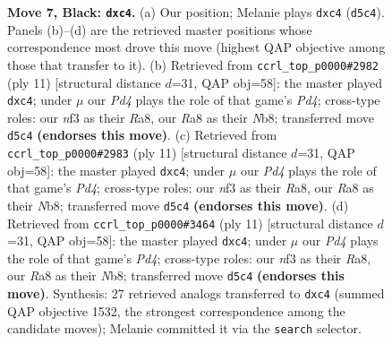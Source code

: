 \documentclass[11pt]{article}
\begin{document}
\begin{figure}[p]
\caption{\textbf{Move 7, Black: \texttt{dxc4}.} (a) Our position; Melanie plays \texttt{dxc4} (\texttt{d5c4}). Panels (b)--(d) are the retrieved master positions whose correspondence most drove this move (highest QAP objective among those that transfer to it). (b) Retrieved from \texttt{ccrl\_top\_p0000\#2982} (ply 11) [structural distance $d$=31, QAP obj=58]: the master played \texttt{dxc4}; under $\mu$ our \emph{Pd4} plays the role of that game's \emph{Pd4}; cross-type roles: our \emph{n}f3 as their \emph{R}a8, our \emph{R}a8 as their \emph{N}b8; transferred move \texttt{d5c4} \textbf{(endorses this move)}. (c) Retrieved from \texttt{ccrl\_top\_p0000\#2983} (ply 11) [structural distance $d$=31, QAP obj=58]: the master played \texttt{dxc4}; under $\mu$ our \emph{Pd4} plays the role of that game's \emph{Pd4}; cross-type roles: our \emph{n}f3 as their \emph{R}a8, our \emph{R}a8 as their \emph{N}b8; transferred move \texttt{d5c4} \textbf{(endorses this move)}. (d) Retrieved from \texttt{ccrl\_top\_p0000\#3464} (ply 11) [structural distance $d$=31, QAP obj=58]: the master played \texttt{dxc4}; under $\mu$ our \emph{Pd4} plays the role of that game's \emph{Pd4}; cross-type roles: our \emph{n}f3 as their \emph{R}a8, our \emph{R}a8 as their \emph{N}b8; transferred move \texttt{d5c4} \textbf{(endorses this move)}. Synthesis: 27 retrieved analogs transferred to \texttt{dxc4} (summed QAP objective 1532, the strongest correspondence among the candidate moves); Melanie committed it via the \texttt{search} selector.}
\label{fig:thought-m13}
\end{figure}

\clearpage
\end{document}
